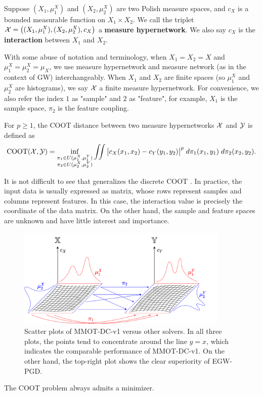 \begin{definition}
Suppose $(X_1, \mu_1^X)$ and $(X_2, \mu_2^X)$ are two Polish measure spaces,
and $c_X$ is a bounded measurable function on $X_1 \times X_2$.
We call the triplet $\mathcal X = \big((X_1, \mu_1^X), (X_2, \mu_2^X), c_X \big)$
a \textbf{measure hypernetwork}. We also say $c_X$ is the \textbf{interaction}
between $X_1$ and $X_2$.
\end{definition}
With some abuse of notation and terminology, when $X_1 = X_2 = X$ and $\mu_1^X = \mu_2^X = \mu_X$,
we use measure hypernetwork and measure network (as in the context of GW) interchangeably.
When $X_1$ and $X_2$ are finite spaces (so $\mu_1^X$ and $\mu_2^X$ are histograms),
we say $\mathcal X$ a finite measure hypernetwork. For convenience, we also refer the index $1$ as "sample"
and $2$ as "feature", for example, $X_1$ is the sample space, $\pi_2$ is the feature coupling.
\begin{definition}
  For $p \geq 1$, the COOT distance between two measure hypernetworks $\mathcal X$ and $\mathcal Y$ is defined as
  \begin{align} \label{eq:cont_coot}
    \text{COOT}(\mathcal X, \mathcal Y) =
    \inf_{\substack{\pi_1 \in U(\mu^X_1, \mu^Y_1) \\
    \pi_2 \in U(\mu^X_2, \mu^Y_2)}} \iint
    \big\vert c_X(x_1, x_2) - c_Y(y_1, y_2) \big\vert^p \; d\pi_1(x_1, y_1) \; d\pi_2(x_2, y_2).
  \end{align}
\end{definition}
It is not difficult to see that  generalizes the discrete COOT \citep{Redko20}.
In practice, the input data is usually expressed as matrix,
whose rows represent samples and columns represent features.
In this case, the interaction value is precisely the coordinate of the data matrix.
On the other hand, the sample and feature spaces are unknown and have little interest and importance.

\begin{figure}[ht]
  \centering
  \includegraphics[width=0.9\textwidth, keepaspectratio]{./Chapitre2/fig/coot_diagram.pdf}
  \caption{Scatter plots of MMOT-DC-v1 versus other solvers. In all three plots, the points tend to concentrate around the line $y=x$,
  which indicates the comparable performance of MMOT-DC-v1. On the other hand, the top-right plot shows the clear superiority of EGW-PGD.}
  \label{fig:continuous_coot}
\end{figure}
\begin{proposition} \label{prop:exist_coot}
  The COOT problem always admits a minimizer.
\end{proposition}

